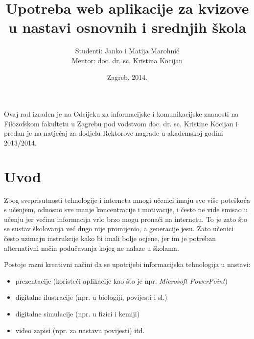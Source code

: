 \documentclass{scrreprt}
\begin{document}
\titlehead{}
\title{Upotreba web aplikacije za kvizove u nastavi osnovnih i srednjih škola}
\author{Studenti: Janko i Matija Marohnić\\Mentor: doc. dr. sc. Kristina
Kocijan} \date{Zagreb, 2014.}

\maketitle

\pagebreak

Ovaj rad izrađen je na Odsijeku za informacijske i komunikacijske znanosti na
Filozofskom fakultetu u Zagrebu pod vodstvom doc. dr. sc. Kristine Kocijan i
predan je na natječaj za dodjelu Rektorove nagrade u akademskoj godini
2013/2014.

\pagebreak

\tableofcontents

\chapter{Uvod}

Zbog sveprisutnosti tehnologije i interneta mnogi učenici imaju sve više
poteškoća s učenjem, odnosno sve manje koncentracije i motivacije, i često ne
vide smisao u učenju jer većinu informacija vrlo brzo mogu pronaći na internetu.
To je zato što se sustav školovanja već dugo nije promijenio, a generacije
jesu.\cite{perisic13} Zato učenici često uzimaju instrukcije kako bi imali bolje
ocjene, jer im je potreban alternativni način podučavanja kojeg ne nalaze u
školama.

Postoje razni kreativni načini da se upotrijebi informacijska tehnologija u
nastavi:

\begin{itemize}
  \item prezentacije (koristeći aplikacije kao što je npr. \emph{Microsoft
    PowerPoint})
  \item digitalne ilustracije (npr. u biologiji, povijesti i sl.)
  \item digitalne simulacije (npr. u fizici i kemiji)
  \item video zapisi (npr. za nastavu povijesti) itd.
\end{itemize}
\end{document}
